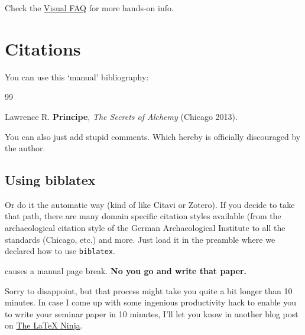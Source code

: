 \documentclass[10pt,a4paper]{article}
\begin{document}
\vspace{1cm} %
Check the \href{http://mirror.utexas.edu/ctan/info/visualFAQ/visualFAQ.pdf}{Visual FAQ} for more hands-on info.

\section{Citations}

You can use this `manual' bibliography:

\begin{thebibliography}{99}

 Lawrence R. \textbf{Principe}, {\it The Secrets of Alchemy} (Chicago 2013).

 You can also just add stupid comments. Which hereby is officially discouraged by the author.

\end{thebibliography}

\subsection*{Using biblatex} %

Or do it the automatic way (kind of like Citavi or Zotero). If you decide to take that path, there are many domain specific citation styles available (from the archaeological citation style of the German Archaeological Institute to all the standards (Chicago, etc.) and more. Just load it in the preamble where we declared how to use \texttt{biblatex}.

\printbibliography[title=My sources]
\newpage causes a manual page break. {\large\bfseries No you go and write that paper.}

Sorry to disappoint, but that process might take you quite a bit longer than 10 minutes. In case I come up with some ingenious productivity hack to enable you to write your seminar paper in 10 minutes, I'll let you know in another blog post on \href{https://latex-ninja.com}{The \LaTeX{} Ninja}.
\end{document}
